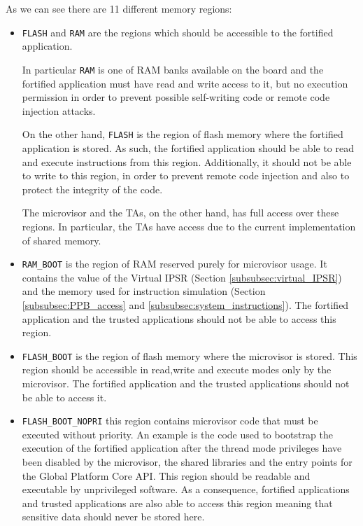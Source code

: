 \documentclass{article}
\begin{document}
As we can see there are 11 different memory regions:
\begin{itemize}
	\item \verb|FLASH| and \verb|RAM| are the regions which should be accessible to the fortified application.
	
	In particular \verb|RAM| is one of RAM banks available on the board and the fortified application must have read and write access to it, but no execution permission in order to prevent possible self-writing code or remote code injection attacks.
	
	On the other hand, \verb|FLASH| is the region of flash memory where the fortified application is stored. As such, the fortified application should be able to read and execute instructions from this region. Additionally, it should not be able to write to this region, in order to prevent remote code injection and also to protect the integrity of the code.
	
	The microvisor and the TAs, on the other hand, has full access over these regions. In particular, the TAs have access due to the current implementation of shared memory. 
	
	\item \verb|RAM_BOOT| is the region of RAM reserved purely for microvisor usage. It contains the value of the Virtual IPSR (Section \ref{subsubsec:virtual_IPSR}) and the memory used for instruction simulation (Section \ref{subsubsec:PPB_access} and \ref{subsubsec:system_instructions}). The fortified application and the trusted applications should not be able to access this region.
	
	\item \verb|FLASH_BOOT| is the region of flash memory where the microvisor is stored. This region should be accessible in read,write and execute modes only by the microvisor. The fortified application and the trusted applications should not be able to access it.
	
	\item \verb|FLASH_BOOT_NOPRI| this region contains microvisor code that must be executed without priority. An example is the code used to bootstrap the execution of the fortified application after the thread mode privileges have been disabled by the microvisor, the shared libraries and the entry points for the Global Platform Core API. This region should be readable and executable by unprivileged software. As a consequence, fortified applications and trusted applications are also able to access this region meaning that sensitive data should never be stored here.


\end{itemize}
\end{document}
